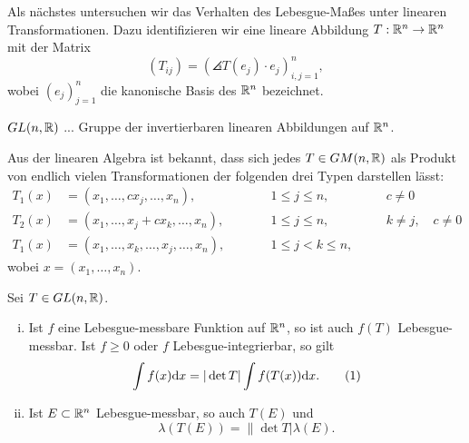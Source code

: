 \begin{prgp}\label{prgp:2-11-5}
  Als nächstes untersuchen wir das Verhalten des Lebesgue-Maßes unter linearen
  Transformationen. Dazu identifizieren wir eine lineare Abbildung $T: \mathbb{R}^n
  \to \mathbb{R}^n$ mit der Matrix
  \[ (T_{ij}) = (\angles{T(e_j) \cdot e_j})_{i,j=1}^n, \]
  wobei $(e_j)_{j=1}^n$ die kanonische Basis des $\mathbb{R}^n$ bezeichnet.

  $GL(n,\mathbb{R})$ ... Gruppe der invertierbaren linearen Abbildungen auf
  $\mathbb{R}^n$.

  Aus der linearen Algebra ist bekannt, dass sich jedes $T \in GM(n,\mathbb{R})$ als
  Produkt von endlich vielen Transformationen der folgenden drei Typen
  darstellen lässt:
  \[ \begin{aligned}
    T_1(x) &= (x_1, \ldots, cx_j, \ldots, x_n), & \qquad &1 \le j \le n, &\quad&
    c \ne 0 \\
    T_2(x) &= (x_1, \ldots, x_j + cx_k, \ldots, x_n), & \qquad &1 \le j \le n,
    &\quad& k \ne j, \quad c \ne 0 \\
    T_1(x) &= (x_1, \ldots, x_k, \ldots, x_j, \ldots, x_n), & \qquad &1 \le j <
    k \le n,
  \end{aligned} \]
  wobei $x = (x_1, \ldots, x_n)$.
\end{prgp}

\begin{thm}
  Sei $T \in GL(n,\mathbb{R})$.
  \begin{enumerate}[(i)]
    \item Ist $f$ eine Lebesgue-messbare Funktion auf $\mathbb{R}^n$, so ist auch
      $f(T)$ Lebesgue-messbar. Ist $f \ge 0$ oder $f$ Lebesgue-integrierbar, so
      gilt
      \[ \int f(x) \mathrm{d} x = | \det T | \int f(T(x)) \mathrm{d} x. \tag{1} \]
    \item Ist $E \subset \mathbb{R}^n$ Lebesgue-messbar, so auch $T(E)$ und
      \[ \lambda(T(E)) = \| \det T | \lambda(E). \]
  \end{enumerate}
\end{thm}


